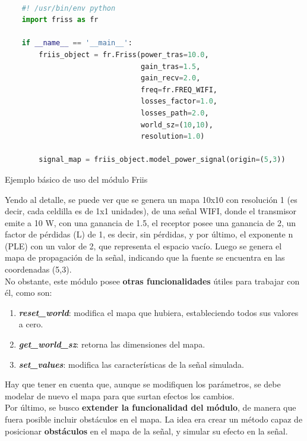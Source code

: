 \begin{code}[H]
    \begin{lstlisting}[language=Python]

    #! /usr/bin/env python    
    import friss as fr

    if __name__ == '__main__':
        friis_object = fr.Friss(power_tras=10.0, 
                                gain_tras=1.5, 
                                gain_recv=2.0,
                                freq=fr.FREQ_WIFI, 
                                losses_factor=1.0, 
                                losses_path=2.0,
                                world_sz=(10,10), 
                                resolution=1.0)

        signal_map = friis_object.model_power_signal(origin=(5,3))

\end{lstlisting}
\caption[Ejemplo básico de uso del módulo Friis]{Ejemplo básico de uso del módulo Friis}
\label{cod:friis_basics}
\end{code}

Yendo al detalle, se puede ver que se genera un mapa 10x10 con resolución 1 (es decir, cada celdilla es de 1x1 unidades), de una señal WIFI, donde el transmisor emite a 10 W, con una ganancia de 1.5, el receptor posee una ganancia de 2, un factor de pérdidas (L) de 1, es decir, sin pérdidas, y por último, el exponente n (\ac{PLE}) con un valor de 2, que representa el espacio vacío. Luego se genera el mapa de propagación de la señal, indicando que la fuente se encuentra en las coordenadas (5,3).\\

No obstante, este módulo posee \textbf{otras funcionalidades} útiles para trabajar con él, como son:

\begin{enumerate}
    \item \textbf{\emph{reset\_world}}: modifica el mapa que hubiera, estableciendo todos sus valores a cero.
    
    \item \textbf{\emph{get\_world\_sz}}: retorna las dimensiones del mapa.
    
    \item \textbf{\emph{set\_values}}: modifica las características de la señal simulada.
\end{enumerate}

Hay que tener en cuenta que, aunque se modifiquen los parámetros, se debe modelar de nuevo el mapa para que surtan efectos los cambios.\\
\newpage
Por último, se busco \textbf{extender la funcionalidad del módulo}, de manera que fuera posible incluir obstáculos en el mapa. La idea era crear un método capaz de posicionar \textbf{obstáculos} en el mapa de la señal, y simular su efecto en la señal.\\

